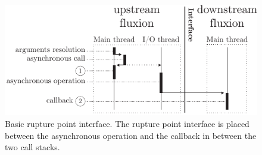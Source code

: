 \begin{figure}[h!]
\begin{center}
  \includegraphics[width=\linewidth]{ressources/basicrp.pdf}
  \caption{Basic rupture point interface. \textnormal{The rupture point interface is placed between the asynchronous operation and the callback in between the two call stacks.}}
  \label{fig:basicrp}
\end{center}
\end{figure}





